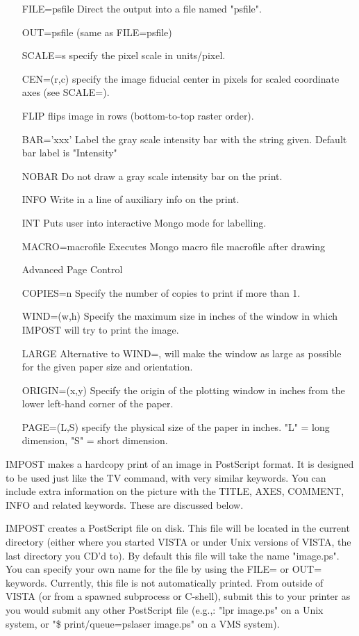 \begin{itemize}
  \item[FILE=psfile]{Direct the output into a file named "psfile".}
  \item[OUT=psfile]{(same as FILE=psfile)}
  \item[SCALE=s ]{specify the pixel scale in units/pixel.}
  \item[CEN=(r,c)]{specify the image fiducial center in pixels for
                  scaled coordinate axes (see SCALE=).}
  \item[FLIP ]{flips image in rows (bottom-to-top raster order).}
  \item[BAR='xxx' ]{Label the gray scale intensity bar with the string
                    given.  Default bar label is "Intensity"}
  \item[NOBAR ]{Do not draw a gray scale intensity bar on the print.}
  \item[INFO ]{Write in a line of auxiliary info on the print.}
  \item[INT  ]{Puts user into interactive Mongo mode for labelling.}
  \item[MACRO=macrofile]{ Executes Mongo macro file macrofile after drawing}
  \item[Advanced Page Control\hfill]{}
  \item[COPIES=n ]{Specify the number of copies to print if more than 1.}
  \item[WIND=(w,h)]{Specify the maximum size in inches of the window in 
                    which IMPOST will try to print the image.}
  \item[LARGE ]{Alternative to WIND=, will make the window as large as 
                possible for the given paper size and orientation.}
  \item[ORIGIN=(x,y)]{Specify the origin of the plotting window in inches 
                      from the lower left-hand corner of the paper.}
  \item[PAGE=(L,S) ]{specify the physical size of the paper in inches.
                     "L" = long dimension, "S" = short dimension.}
\end{itemize}

IMPOST makes a hardcopy print of an image in PostScript format.  It
is designed to be used just like the TV command, with very similar
keywords. You can include extra information on the picture with the
TITLE, AXES, COMMENT, INFO and related keywords.  These are discussed
below.
 
IMPOST creates a PostScript file on disk.  This file will be located in the
current directory (either where you started VISTA or under Unix versions of
VISTA, the last directory you CD'd to).  By default this file will take the
name "image.ps".  You can specify your own name for the file by using the
FILE= or OUT= keywords.  Currently, this file is not automatically printed.
From outside of VISTA (or from a spawned subprocess or C-shell), submit
this to your printer as you would submit any other PostScript file (e.g.,:
"lpr image.ps" on a Unix system, or "\$ print/queue=pslaser image.ps" on a
VMS system).

